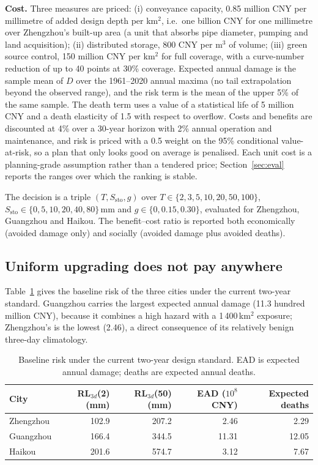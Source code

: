 \textbf{Cost.} Three measures are priced: (i) conveyance capacity, 0.85 million CNY per millimetre of added design depth per km$^2$, i.e.\ one billion CNY for one millimetre over Zhengzhou's built-up area (a unit that absorbs pipe diameter, pumping and land acquisition); (ii) distributed storage, 800 CNY per m$^3$ of volume; (iii) green source control, 150 million CNY per km$^2$ for full coverage, with a curve-number reduction of up to 40 points at 30\% coverage. Expected annual damage is the sample mean of $D$ over the 1961--2020 annual maxima (no tail extrapolation beyond the observed range), and the risk term is the mean of the upper 5\% of the same sample. The death term uses a value of a statistical life of 5 million CNY and a death elasticity of 1.5 with respect to overflow. Costs and benefits are discounted at 4\% over a 30-year horizon with 2\% annual operation and maintenance, and risk is priced with a 0.5 weight on the 95\% conditional value-at-risk, so a plan that only looks good on average is penalised. Each unit cost is a planning-grade assumption rather than a tendered price; Section~\ref{sec:eval} reports the ranges over which the ranking is stable.

The decision is a triple $(T,S_{\text{sto}},g)$ over $T\in\{2,3,5,10,20,50,100\}$, $S_{\text{sto}}\in\{0,5,10,20,40,80\}$\,mm and $g\in\{0,0.15,0.30\}$, evaluated for Zhengzhou, Guangzhou and Haikou. The benefit--cost ratio is reported both economically (avoided damage only) and socially (avoided damage plus avoided deaths).

\subsection{Uniform upgrading does not pay anywhere}

Table~\ref{tab:q5base} gives the baseline risk of the three cities under the current two-year standard. Guangzhou carries the largest expected annual damage (11.3 hundred million CNY), because it combines a high hazard with a 1\,400\,km$^2$ exposure; Zhengzhou's is the lowest (2.46), a direct consequence of its relatively benign three-day climatology.

\begin{table}[H]
\centering
\caption{Baseline risk under the current two-year design standard. EAD is expected annual damage; deaths are expected annual deaths.}
\label{tab:q5base}
\small
\begin{tabular}{lrrrr}
\toprule
City & RL$_{3d}$(2) (mm) & RL$_{3d}$(50) (mm) & EAD ($10^8$ CNY) & Expected deaths\\
\midrule
Zhengzhou & 102.9 & 207.2 & 2.46 & 2.29\\
Guangzhou & 166.4 & 344.5 & 11.31 & 12.05\\
Haikou & 201.6 & 574.7 & 3.12 & 7.67\\
\bottomrule
\end{tabular}
\end{table}

